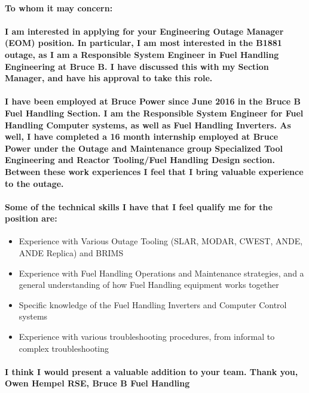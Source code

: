 \documentclass{article}
\begin{document}
\paragraph{To whom it may concern:}
\paragraph{
I am interested in applying for your Engineering Outage Manager (EOM) position. In particular, I am most interested in the B1881 outage, as I am a Responsible System Engineer in Fuel Handling Engineering at Bruce B. I have discussed this with my Section Manager, and have his approval to take this role.}
\paragraph{
I have been employed at Bruce Power since June 2016 in the Bruce B Fuel Handling Section. I am the Responsible System Engineer for Fuel Handling Computer systems, as well as Fuel Handling Inverters. As well, I have completed a 16 month internship employed at Bruce Power under the Outage and Maintenance group Specialized Tool Engineering and Reactor Tooling/Fuel Handling Design section. Between these work experiences I feel that I bring valuable experience to the outage.}

\paragraph{
Some of the technical skills I have that I feel qualify me for the position are:}

\begin{itemize}
\item{Experience with Various Outage Tooling (SLAR, MODAR, CWEST, ANDE, ANDE Replica) and BRIMS}
\item{Experience with Fuel Handling Operations and Maintenance strategies, and a general understanding of how Fuel Handling equipment works together}
\item{Specific knowledge of the Fuel Handling Inverters and Computer Control systems}
\item{Experience with various troubleshooting procedures, from informal to complex troubleshooting}
\end{itemize}

\paragraph{
I think I would present a valuable addition to your team. Thank you,
\newline
Owen Hempel
\newline
RSE, Bruce B Fuel Handling}
\end{document}
